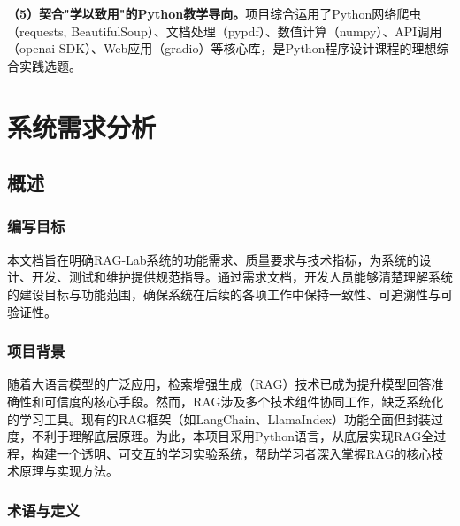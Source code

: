 \documentclass[10pt,a4paper]{article}
\begin{document}
\textbf{（5）契合"学以致用"的Python教学导向。}项目综合运用了Python网络爬虫（requests, BeautifulSoup）、文档处理（pypdf）、数值计算（numpy）、API调用（openai SDK）、Web应用（gradio）等核心库，是Python程序设计课程的理想综合实践选题。

\section{系统需求分析}

\subsection{概述}

\subsubsection{编写目标}

本文档旨在明确RAG-Lab系统的功能需求、质量要求与技术指标，为系统的设计、开发、测试和维护提供规范指导。通过需求文档，开发人员能够清楚理解系统的建设目标与功能范围，确保系统在后续的各项工作中保持一致性、可追溯性与可验证性。

\subsubsection{项目背景}

随着大语言模型的广泛应用，检索增强生成（RAG）技术已成为提升模型回答准确性和可信度的核心手段。然而，RAG涉及多个技术组件协同工作，缺乏系统化的学习工具。现有的RAG框架（如LangChain、LlamaIndex）功能全面但封装过度，不利于理解底层原理。为此，本项目采用Python语言，从底层实现RAG全过程，构建一个透明、可交互的学习实验系统，帮助学习者深入掌握RAG的核心技术原理与实现方法。

\subsubsection{术语与定义}
\end{document}
